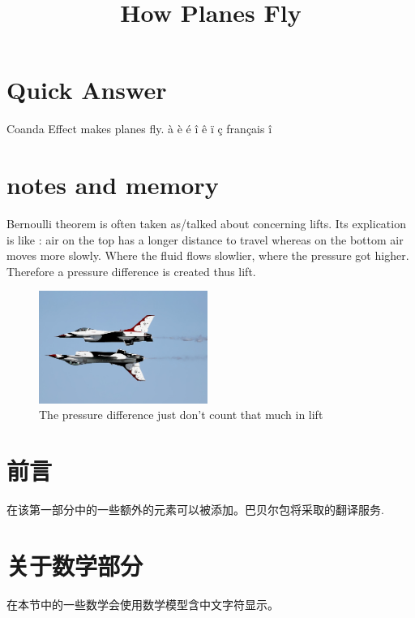 \documentclass[a4paper,10pt]{article}
\title{
How Planes Fly 
 \cite{Louapre}
 \cite{Goulu}
 \cite{CouleurScience}
}
\begin{document}
\parindent=0cm
\parskip=3mm

\maketitle


\section{Quick Answer}

Coanda Effect makes planes fly.   
à
è
é
î
ê
ï
ç
français
î

\section{notes and memory}

Bernoulli theorem is often taken as/talked about concerning lifts. Its explication is like : air on the top has a longer distance to travel whereas on the bottom air moves more slowly. Where the fluid flows slowlier, where the pressure got higher. Therefore a pressure difference is created thus lift.\\


\begin{figure}[h!]
\centering
\includegraphics[width=0.49\textwidth]{Wrong-Bernouilli}
\caption{\label{fig:1} The pressure difference just don't count that much in lift}
\end{figure}

\begin{CJK*}{UTF8}{gbsn}
 
\section{前言}
在该第一部分中的一些额外的元素可以被添加。巴贝尔包将采取的翻译服务.

\section{关于数学部分}
在本节中的一些数学会使用数学模型含中文字符显示。
 
\end{CJK*}
\end{document}
